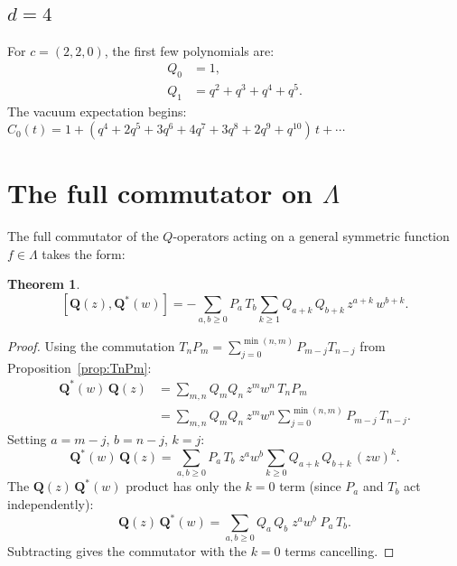 \documentclass[11pt]{article}
\newcommand{\La}{\Lambda}
\theoremstyle{plain}
\newtheorem{theorem}{Theorem}
\theoremstyle{definition}
\begin{document}
\subsection{$d = 4$}

For $c = (2,2,0)$, the first few polynomials are:
\begin{align*}
  Q_0 &= 1, \\
  Q_1 &= q^2 + q^3 + q^4 + q^5.
\end{align*}
The vacuum expectation begins:
$C_0(t) = 1 + (q^4 + 2q^5 + 3q^6 + 4q^7 + 3q^8
+ 2q^9 + q^{10})\, t + \cdots$


\section{The full commutator on $\La$}
\label{sec:full-comm}

The full commutator of the $Q$-operators acting on a general
symmetric function $f \in \La$ takes the form:

\begin{theorem}\label{thm:full-comm}
\begin{equation}\label{eq:full-comm}
  [\mathbf{Q}(z), \mathbf{Q}^*(w)]
  = -\sum_{a,b \geq 0} P_a\, T_b
    \sum_{k \geq 1} Q_{a+k}\, Q_{b+k}\, z^{a+k}\, w^{b+k}.
\end{equation}
\end{theorem}

\begin{proof}
Using the commutation $T_n P_m = \sum_{j=0}^{\min(n,m)} P_{m-j}
T_{n-j}$ from Proposition~\ref{prop:TnPm}:
\begin{align*}
  \mathbf{Q}^*(w)\, \mathbf{Q}(z)
  &= \sum_{m,n} Q_m Q_n\, z^m w^n\, T_n P_m \\
  &= \sum_{m,n} Q_m Q_n\, z^m w^n
    \sum_{j=0}^{\min(n,m)} P_{m-j}\, T_{n-j}.
\end{align*}
Setting $a = m - j$, $b = n - j$, $k = j$:
\[
  \mathbf{Q}^*(w)\, \mathbf{Q}(z)
  = \sum_{a,b \geq 0} P_a\, T_b\; z^a w^b
    \sum_{k \geq 0} Q_{a+k}\, Q_{b+k}\, (zw)^k.
\]
The $\mathbf{Q}(z)\, \mathbf{Q}^*(w)$ product has only the
$k = 0$ term (since $P_a$ and $T_b$ act independently):
\[
  \mathbf{Q}(z)\, \mathbf{Q}^*(w)
  = \sum_{a,b \geq 0} Q_a\, Q_b\; z^a w^b\; P_a\, T_b.
\]
Subtracting gives the commutator with the $k = 0$ terms cancelling.
\end{proof}
\end{document}
